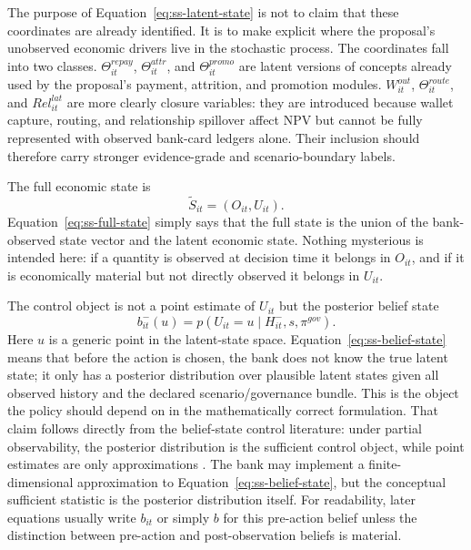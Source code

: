 \documentclass[11pt]{article}
\newcommand{\1}{\mathbf{1}}
\begin{document}
The purpose of Equation~\eqref{eq:ss-latent-state} is not to claim that these
coordinates are already identified. It is to make explicit where the proposal's
unobserved economic drivers live in the stochastic process.
The coordinates fall into two classes. $\Theta^{repay}_{it}$,
$\Theta^{attr}_{it}$, and $\Theta^{promo}_{it}$ are latent versions of concepts
already used by the proposal's payment, attrition, and promotion modules.
$W^{out}_{it}$, $\Theta^{route}_{it}$, and $Rel^{lat}_{it}$ are more clearly
closure variables: they are introduced because wallet capture, routing, and
relationship spillover affect NPV but cannot be fully represented with observed
bank-card ledgers alone. Their inclusion should therefore carry stronger
evidence-grade and scenario-boundary labels.

The full economic state is
\begin{equation}
  \widetilde S_{it} = (O_{it},U_{it}).
  \label{eq:ss-full-state}
\end{equation}
Equation~\eqref{eq:ss-full-state} simply says that the full state is the union
of the bank-observed state vector and the latent economic state. Nothing
mysterious is intended here: if a quantity is observed at decision time it
belongs in $O_{it}$, and if it is economically material but not directly
observed it belongs in $U_{it}$.

The control object is not a point estimate of $U_{it}$ but the posterior
belief state
\begin{equation}
  b^{-}_{it}(u)
  =
  p(U_{it}=u\mid H_{it}^{-},s,\pi^{gov}).
  \label{eq:ss-belief-state}
\end{equation}
Here $u$ is a generic point in the latent-state space. Equation~\eqref{eq:ss-belief-state}
means that before the action is chosen, the bank does not know the true latent
state; it only has a posterior distribution over plausible latent states given
all observed history and the declared scenario/governance bundle. This is the
object the policy should depend on in the mathematically correct formulation.
That claim follows directly from the belief-state control literature: under
partial observability, the posterior distribution is the sufficient control
object, while point estimates are only approximations
\citep{smallwood1973pomdp,kaelbling1998pomdp}.
The bank may implement a finite-dimensional approximation to
Equation~\eqref{eq:ss-belief-state}, but the conceptual sufficient statistic is
the posterior distribution itself.
For readability, later equations usually write $b_{it}$ or simply $b$ for this
pre-action belief unless the distinction between pre-action and post-observation
beliefs is material.
\end{document}
